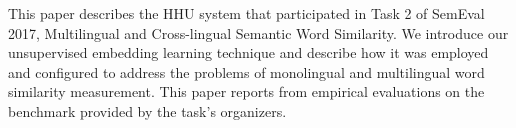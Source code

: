 This paper describes the HHU system that participated in Task 2 of SemEval 2017, Multilingual and Cross-lingual Semantic Word Similarity. We introduce our unsupervised embedding learning technique and describe how it was employed and configured to address the problems of monolingual and multilingual word similarity measurement. This paper reports from empirical evaluations on the benchmark provided by the task's organizers.
